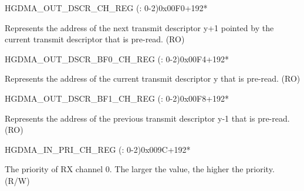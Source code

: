 \begin{register}{H}{GDMA\_OUT\_DSCR\_CH\_REG (: 0-2)}{0x00F0+192*}\label{regdesc:GDMAOUTDSCRCHNREG}
%
\regnewline%
\begin{regdesc}\begin{reglist}
\label{fielddesc:GDMAOUTLINKDSCRCHN}\item [GDMA\_OUTLINK\_DSCR\_CH\regindex{n}] Represents the address of the next transmit descriptor y+1 pointed by the current transmit descriptor that is pre-read. (RO)
\end{reglist}\end{regdesc}
\end{register}


\begin{register}{H}{GDMA\_OUT\_DSCR\_BF0\_CH\_REG (: 0-2)}{0x00F4+192*}\label{regdesc:GDMAOUTDSCRBF0CHNREG}
%
\regnewline%
\begin{regdesc}\begin{reglist}
\label{fielddesc:GDMAOUTLINKDSCRBF0CHN}\item [GDMA\_OUTLINK\_DSCR\_BF0\_CH\regindex{n}] Represents the address of the current transmit descriptor y that is pre-read. (RO)
\end{reglist}\end{regdesc}
\end{register}


\begin{register}{H}{GDMA\_OUT\_DSCR\_BF1\_CH\_REG (: 0-2)}{0x00F8+192*}\label{regdesc:GDMAOUTDSCRBF1CHNREG}
%
\regnewline%
\begin{regdesc}\begin{reglist}
\label{fielddesc:GDMAOUTLINKDSCRBF1CHN}\item [GDMA\_OUTLINK\_DSCR\_BF1\_CH\regindex{n}] Represents the address of the previous transmit descriptor y-1 that is pre-read. (RO)
\end{reglist}\end{regdesc}
\end{register}


\begin{register}{H}{GDMA\_IN\_PRI\_CH\_REG (: 0-2)}{0x009C+192*}\label{regdesc:GDMAINPRICHNREG}
%
%
\regnewline%
\begin{regdesc}\begin{reglist}
\label{fielddesc:GDMARXPRICHN}\item [GDMA\_RX\_PRI\_CH\regindex{n}] The priority of RX channel 0. The larger the value, the higher the priority. (R/W)
\end{reglist}\end{regdesc}
\end{register}


